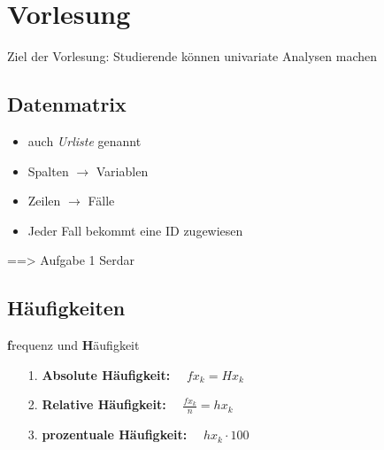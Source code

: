 \section{Vorlesung}

Ziel der Vorlesung: Studierende können univariate Analysen machen\\


\subsection{Datenmatrix}
\begin{itemize}
 \item auch \textit{Urliste} genannt
 \item Spalten $\rightarrow$ Variablen
 \item Zeilen  $\rightarrow$ Fälle
 \item Jeder Fall bekommt eine ID zugewiesen
\end{itemize}
==> Aufgabe 1 Serdar
\subsection{Häufigkeiten}
\textbf{f}requenz und \textbf{H}äufigkeit
\begin{itemize}
 \item [1.] \textbf{Absolute Häufigkeit:}~~ $fx_k = Hx_k$
 \item [2.] \textbf{Relative Häufigkeit:}~~ $\frac{fx_k}{n} = hx_k$
 \item [3.] \textbf{prozentuale Häufigkeit:}~~ $hx_k \cdot 100$
\end{itemize}

